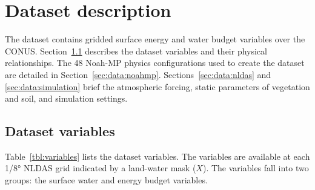 \documentclass[essd]{copernicus}
\begin{document}
\section{Dataset description} \label{sec:data}

The dataset contains gridded surface energy and water budget variables over the CONUS. Section~\ref{sec:data:variables} describes the dataset variables and their physical relationships. The 48 Noah-MP physics configurations used to create the dataset are detailed in Section~\ref{sec:data:noahmp}. Sections~\ref{sec:data:nldas} and \ref{sec:data:simulation} brief the atmospheric forcing, static parameters of vegetation and soil, and simulation settings.


\subsection{Dataset variables} \label{sec:data:variables}

Table~\ref{tbl:variables} lists the dataset variables. The variables are available at each 1/8° NLDAS grid indicated by a land-water mask ($X$). The variables fall into two groups: the surface water and energy budget variables.
\end{document}
